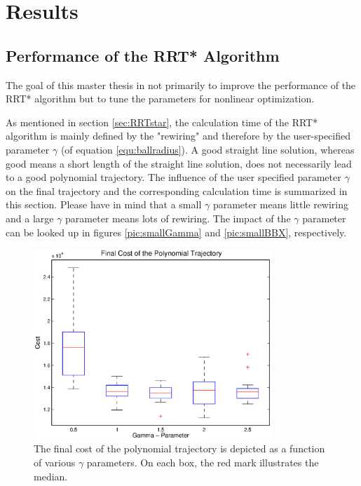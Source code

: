 \chapter{Results}\label{chap:Results}

\section{Performance of the RRT* Algorithm}\label{sec:performanceRRT}

The goal of this master thesis in not primarily to improve the performance of the RRT* algorithm but to tune the parameters for nonlinear optimization. \newline

As mentioned in section \ref{sec:RRTstar}, the calculation time of the RRT* algorithm is mainly defined by the "rewiring" and therefore by the user-specified parameter $\gamma$ (of equation \ref{equ:ballradius}). A good straight line solution, whereas good means a short length of the straight line solution, does not necessarily lead to a good polynomial trajectory. The influence of the user specified parameter $\gamma$ on the final trajectory and the corresponding calculation time is summarized in this section. \newline
Please have in mind that a small $\gamma$ parameter means little rewiring and a large $\gamma$ parameter means lots of rewiring. The impact of the $\gamma$ parameter can be looked up in figures \ref{pic:smallGamma} and \ref{pic:smallBBX}, respectively.\newline

\begin{figure}[H]
   \centering
   \includegraphics[trim = 14mm 10mm 15mm 0mm,clip,width=0.8\textwidth]{pics/boxplot1.eps}
   \caption{The final cost of the polynomial trajectory is depicted as a function of various $\gamma$ parameters. On each box, the red mark illustrates the median.}
   \label{pic:boxplot}
\end{figure}

